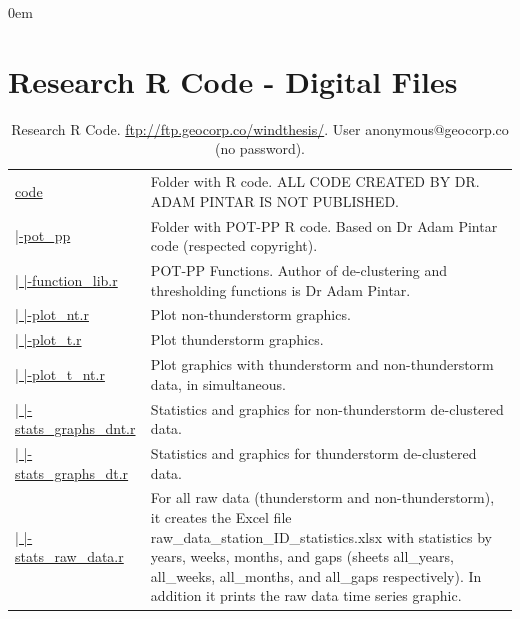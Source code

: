 \documentclass[12pt,oneside]{reedthesis}
\begin{document}
\appendix

\parindent0em

\hypertarget{rcode}{%
\chapter{Research R Code - Digital Files}\label{rcode}}

\begingroup\fontsize{7}{9}\selectfont
\begin{longtable}[t]{>{\raggedright\arraybackslash}p{1.3in}>{\raggedright\arraybackslash}p{4.9in}}
\caption[Research R Code]{\label{tab:code}Research R Code. \href{ftp://ftp.geocorp.co/windthesis/}{ftp://ftp.geocorp.co/windthesis/}. User anonymous@geocorp.co (no password).}\\
\toprule
\multicolumn{1}{l}{Folder Tree - Ftp Links} & \multicolumn{1}{l}{Description}\\
\midrule
\href{ftp://ftp.geocorp.co/windthesis/code/}{code} & Folder with R code. ALL CODE CREATED BY DR. ADAM PINTAR IS NOT PUBLISHED.\\
\href{ftp://ftp.geocorp.co/windthesis/code/pot_pp/}{  |-pot\_pp} & Folder with POT-PP R code. Based on Dr Adam Pintar code (respected copyright).\\
\href{ftp://ftp.geocorp.co/windthesis/code/pot_pp/function_lib.r}{  |    |-function\_lib.r} & POT-PP Functions. Author of de-clustering and thresholding functions is Dr Adam Pintar.\\
\href{ftp://ftp.geocorp.co/windthesis/code/pot_pp/plot_nt.r}{  |    |-plot\_nt.r} & Plot non-thunderstorm graphics.\\
\href{ftp://ftp.geocorp.co/windthesis/code/pot_pp/plot_t.r}{  |    |-plot\_t.r} & Plot thunderstorm graphics.\\
\href{ftp://ftp.geocorp.co/windthesis/code/pot_pp/plot_t_nt.r}{  |    |-plot\_t\_nt.r} & Plot graphics with thunderstorm and non-thunderstorm data, in simultaneous.\\
\href{ftp://ftp.geocorp.co/windthesis/code/pot_pp/statistics_and_graphics_declustered_nt.r}{  |    |-stats\_graphs\_dnt.r} & Statistics and graphics for non-thunderstorm de-clustered data.\\
\href{ftp://ftp.geocorp.co/windthesis/code/pot_pp/statistics_and_graphics_declustered_t.r}{  |    |-stats\_graphs\_dt.r} & Statistics and graphics for thunderstorm de-clustered data.\\
\href{ftp://ftp.geocorp.co/windthesis/code/pot_pp/statistics_raw_data.r}{  |    |-stats\_raw\_data.r} & For all raw data (thunderstorm and non-thunderstorm), it creates the Excel file raw\_data\_station\_ID\_statistics.xlsx with statistics by years, weeks, months, and gaps (sheets all\_years, all\_weeks, all\_months, and all\_gaps respectively). In addition it prints the raw data time series graphic.\\

\end{longtable}
\end{document}
